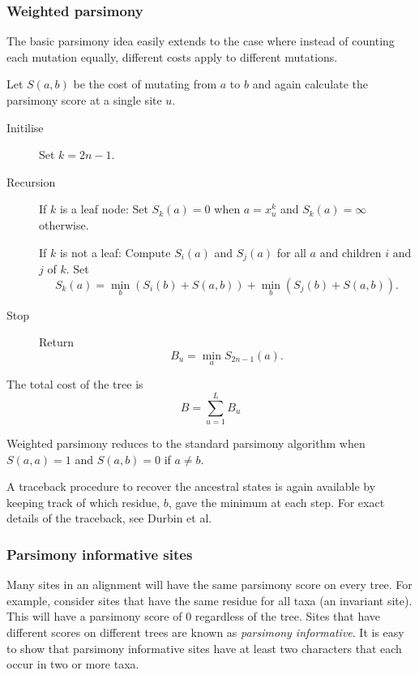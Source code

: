 \documentclass[11pt]{article}
\begin{document}
\subsubsection{Weighted parsimony}

The basic parsimony idea easily extends to the case where instead of counting each mutation equally, different costs apply to  different mutations.

Let $S(a,b)$ be the cost of mutating from $a$ to $b$ and again calculate the  parsimony score at a single site $u$.

\begin{description}
\item[Initilise] Set $k = 2n-1$.
\item[Recursion] 

If $k$ is a leaf node:  Set $S_k(a) = 0$ when $a =  x^k_u$ and  $S_k(a) = \infty$ otherwise.

If $k$ is not a leaf: Compute $S_i(a)$ and $S_j(a)$ for all $a$ and children $i$ and $j$ of $k$.  
Set $$S_k(a) = \min_b \left(S_i(b) +S(a,b)\right) + \min_b \left(S_j(b) + S(a,b)\right).$$

\item[Stop] Return  $$B_u = \min_a S_{2n-1}(a).$$
\end{description}


The total cost of the tree is $$B = \sum_{u = 1}^L B_u$$

Weighted parsimony reduces to the standard parsimony algorithm when $S(a,a) = 1$ and $S(a,b) = 0$ if $a \neq b$.

A traceback procedure to recover the ancestral states is again available by keeping track of which residue, $b$, gave the minimum at each step.   For exact details of the traceback, see Durbin et al.




\subsubsection{Parsimony informative sites}

Many sites in an alignment will have the same parsimony score on every tree.  For example, consider sites that have the same residue for all taxa (an invariant site).  This will have a parsimony score of 0 regardless of the tree.  Sites that have different scores on different trees are known as {\em parsimony informative}.  It is easy to show that parsimony informative sites have at least two characters that each occur in two or more taxa.   
\end{document}
